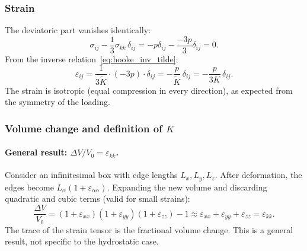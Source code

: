 \begin{center}
\end{center}

\subsubsection*{Strain}
The deviatoric part vanishes identically:
\[
    \sigma_{ij} - \frac{1}{3}\sigma_{kk}\,\delta_{ij} = -p\delta_{ij} - \frac{-3p}{3}\delta_{ij} = 0.
\]
From the inverse relation~\eqref{eq:hooke_inv_tilde}:
\begin{equation}
    \varepsilon_{ij} = \frac{1}{3\tilde{K}}\cdot(-3p)\cdot\delta_{ij} = -\frac{p}{\tilde{K}}\,\delta_{ij} = -\frac{p}{3K}\,\delta_{ij}.
    \label{eq:hydrostatic_eps}
\end{equation}
The strain is isotropic (equal compression in every direction), as expected from the symmetry of the loading.

\subsubsection*{Volume change and definition of $K$}

\paragraph{General result: $\Delta V/V_0 = \varepsilon_{kk}$.}
Consider an infinitesimal box with edge lengths $L_x, L_y, L_z$. After deformation, the edges become $L_\alpha(1+\varepsilon_{\alpha\alpha})$. Expanding the new volume and discarding quadratic and cubic terms (valid for small strains):
\[
    \frac{\Delta V}{V_0} = (1+\varepsilon_{xx})(1+\varepsilon_{yy})(1+\varepsilon_{zz}) - 1 \approx \varepsilon_{xx}+\varepsilon_{yy}+\varepsilon_{zz} = \varepsilon_{kk}.
\]
The trace of the strain tensor is the fractional volume change. This is a general result, not specific to the hydrostatic case.


